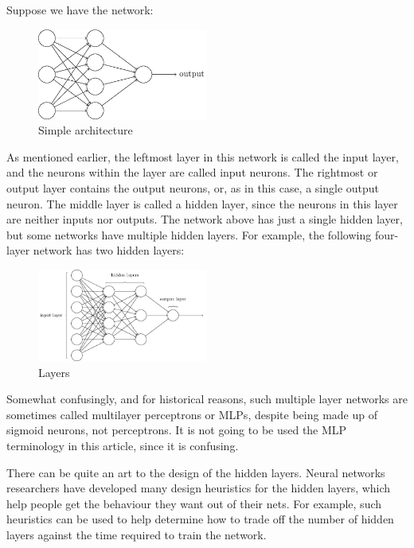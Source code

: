 \documentclass[12 pt]{article}
\begin{document}
Suppose we have the network:

\newpage
\begin{figure}[htp]
\centering
\includegraphics[width=0.5\textwidth]{./figs/tikz10.png}
\caption{Simple architecture}
\end{figure}

As mentioned earlier, the leftmost layer in this network is called the
input layer, and the neurons within the layer are called input neurons.
The rightmost or output layer contains the output neurons, or, as in
this case, a single output neuron. The middle layer is called a hidden
layer, since the neurons in this layer are neither inputs nor outputs.
The network above has just a single hidden layer, but some networks have
multiple hidden layers. For example, the following four-layer network
has two hidden layers:

\begin{figure}[htp]
\centering
\includegraphics[width=0.5\textwidth]{./figs/tikz11.png}
\caption{Layers}
\end{figure}

Somewhat confusingly, and for historical reasons, such multiple layer
networks are sometimes called multilayer perceptrons or MLPs, despite
being made up of sigmoid neurons, not perceptrons. It is not going to be
used the MLP terminology in this article, since it is confusing.

There can be quite an art to the design of the hidden layers. Neural
networks researchers have developed many design heuristics for the
hidden layers, which help people get the behaviour they want out of
their nets. For example, such heuristics can be used to help determine
how to trade off the number of hidden layers against the time required
to train the network.
\end{document}
